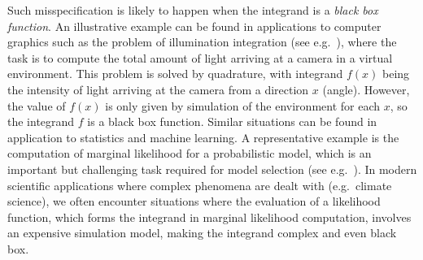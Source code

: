 \documentclass[11pt]{article}
\theoremstyle{remark}
\theoremstyle{example}
\theoremstyle{remark}
\newcommand{\R}{\mathbb{R}}
\newcommand{\citealp}{\cite}
\begin{document}
Such misspecification is likely to happen when the integrand is a {\em black box function}.
An illustrative example can be found in applications to computer graphics such as 
the problem of illumination integration (see e.g.~\citealp{BriOatGirOsbSej15}), where the task is to compute the total amount of light arriving at a camera in a virtual environment.
This problem is solved by quadrature, with integrand $f(x)$ being the intensity of light arriving at the camera from a direction $x$ (angle).
However, the value of $f(x)$ is only given by simulation of the environment for each $x$, so the integrand $f$ is a black box function.
Similar situations can be found in application to statistics and machine learning.
A representative example is the computation of marginal likelihood for a probabilistic model, which is an important but challenging task required for model selection (see e.g.~\citealp{OatPapGir16}).  
In modern scientific applications where complex phenomena are dealt with (e.g.~climate science), we often encounter situations where the evaluation of a likelihood function, which forms the integrand in marginal likelihood computation, involves an expensive simulation model, making the integrand complex and even black box.
\end{document}
